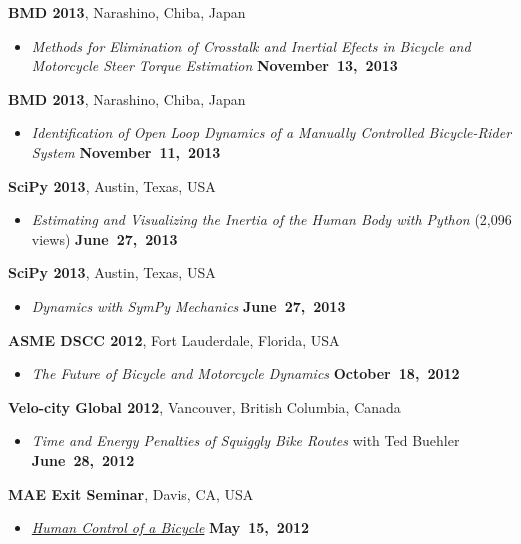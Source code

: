 \documentclass[10pt]{article}
\newenvironment{outerlist}[1][\enskip\textbullet]%
        {\begin{itemize}[#1]}{\end{itemize}%
         \vspace{-.6\baselineskip}}
\newcommand{\blankline}{\quad\pagebreak[2]}
\begin{document}
\blankline

\textbf{BMD 2013}, Narashino, Chiba, Japan
\begin{outerlist}
  \item[] \textit{Methods for Elimination of Crosstalk and Inertial Efects in
    Bicycle and Motorcycle Steer Torque Estimation}
    \hfill \textbf{November~13,~2013}
\end{outerlist}

\blankline

\textbf{BMD 2013}, Narashino, Chiba, Japan
\begin{outerlist}
  \item[] \textit{Identification of Open Loop Dynamics of a Manually Controlled
    Bicycle-Rider System}
    \hfill \textbf{November~11,~2013}
\end{outerlist}

\blankline

\textbf{SciPy 2013}, Austin, Texas, USA
\begin{outerlist}
  \item[] \textit{Estimating and Visualizing the Inertia of the Human Body with
    Python} (2,096 views)
    \hfill \textbf{June~27,~2013}
\end{outerlist}

\blankline

\textbf{SciPy 2013}, Austin, Texas, USA
\begin{outerlist}
  \item[] \textit{Dynamics with SymPy Mechanics}
    \hfill \textbf{June~27,~2013}
\end{outerlist}

\blankline

\textbf{ASME DSCC 2012}, Fort Lauderdale, Florida, USA
\begin{outerlist}
  \item[] \textit{The Future of Bicycle and Motorcycle Dynamics}
    \hfill \textbf{October~18,~2012}
\end{outerlist}

\blankline

\textbf{Velo-city Global 2012}, Vancouver, British Columbia, Canada
\begin{outerlist}
  \item[] \textit{Time and Energy Penalties of Squiggly Bike Routes} with Ted
    Buehler
  \hfill \textbf{June~28,~2012}
\end{outerlist}

\blankline

\textbf{MAE Exit Seminar}, Davis, CA, USA
\begin{outerlist}
  \item[] \textit{\href{http://youtu.be/oKbaHCGK94E}{Human Control of a
    Bicycle}}
  \hfill \textbf{May~15,~2012}
\end{outerlist}
\end{document}
